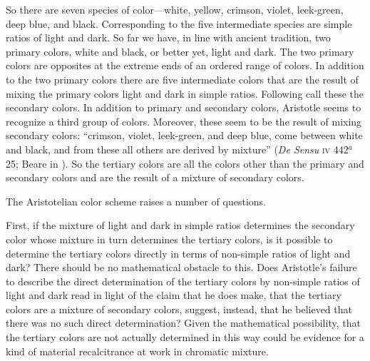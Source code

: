So there are seven species of color---white, yellow, crimson, violet, leek-green, deep blue, and black. Corresponding to the five intermediate species are simple ratios of light and dark. So far we have, in line with ancient tradition, two primary colors, white and black, or better yet, light and dark. The two primary colors are opposites at the extreme ends of an ordered range of colors. In addition to the two primary colors there are five intermediate colors that are the result of mixing the primary colors light and dark in simple ratios. Following \citet[297]{Sorabji:2022qf} call these the secondary colors. In addition to primary and secondary colors, Aristotle seems to recognize a third group of colors. Moreover, these seem to be the result of mixing secondary colors: ``crimson, violet, leek-green, and deep blue, come between white and black, and from these all others are derived by mixture'' (\emph{De Sensu} \textsc{iv} 442\( ^{a} \)25; Beare in \citealt[12]{Barnes:1984uq}). So the tertiary colors are all the colors other than the primary and secondary colors and are the result of a mixture of secondary colors. 

The Aristotelian color scheme raises a number of questions.

First, if the mixture of light and dark in simple ratios determines the secondary color whose mixture in turn determines the tertiary colors, is it possible to determine the tertiary colors directly in terms of non-simple ratios of light and dark? There should be no mathematical obstacle to this. Does Aristotle's failure to describe the direct determination of the tertiary colors by non-simple ratios of light and dark read in light of the claim that he does make, that the tertiary colors are a mixture of secondary colors, suggest, instead, that he believed that there was no such direct determination? Given the mathematical possibility, that the tertiary colors are not actually determined in this way could be evidence for a kind of material recalcitrance at work in chromatic mixture.

